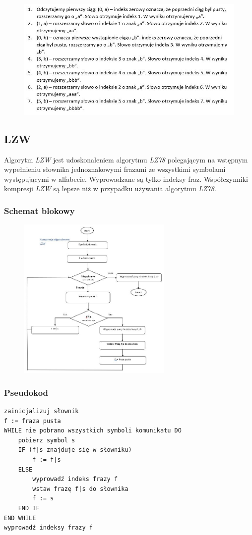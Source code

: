 \documentclass{article}
\begin{document}
\begin{figure}[h!]
\centering
\includegraphics{img/lz78_4.JPG}
\end{figure}

\subsection{LZW}
Algorytm \textit{LZW} jest udoskonaleniem algorytmu \textit{LZ78} polegającym na wstępnym wypełnieniu słownika jednoznakowymi frazami ze wszystkimi symbolami występującymi w alfabecie. Wyprowadzane są tylko indeksy fraz. Współczynniki kompresji \textit{LZW} są lepsze niż w przypadku używania algorytmu \textit{LZ78}.

\subsubsection{Schemat blokowy}
\begin{figure}[h!]
\centering
\includegraphics[height=300px]{img/schemat_lzw.JPG}
\end{figure}

\subsubsection{Pseudokod}
\begin{verbatim}
zainicjalizuj słownik
f := fraza pusta
WHILE nie pobrano wszystkich symboli komunikatu DO  
    pobierz symbol s
    IF (f|s znajduje się w słowniku)
        f := f|s
    ELSE
        wyprowadź indeks frazy f
        wstaw frazę f|s do słownika 
        f := s
    END IF
END WHILE
wyprowadź indeksy frazy f
\end{verbatim}
\end{document}
